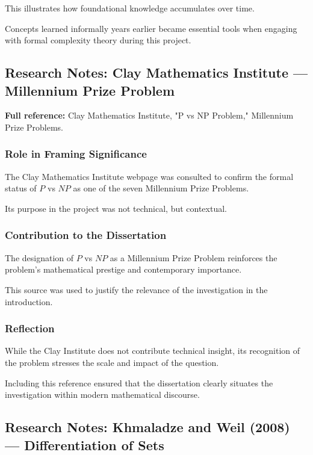 \documentclass[12pt]{article}
\begin{document}
This illustrates how foundational knowledge accumulates over time.

Concepts learned informally years earlier became essential tools when engaging with formal complexity theory during this project.

\subsection{Research Notes: Clay Mathematics Institute --- Millennium Prize Problem}

\textbf{Full reference:} Clay Mathematics Institute,
"P vs NP Problem,"
Millennium Prize Problems.

\subsubsection*{Role in Framing Significance}

The Clay Mathematics Institute webpage was consulted to confirm the formal status of $P$ vs $NP$ as one of the seven Millennium Prize Problems.

Its purpose in the project was not technical, but contextual.

\subsubsection*{Contribution to the Dissertation}

The designation of $P$ vs $NP$ as a Millennium Prize Problem reinforces the problem's mathematical prestige and contemporary importance.

This source was used to justify the relevance of the investigation in the introduction.

\subsubsection*{Reflection}

While the Clay Institute does not contribute technical insight, its recognition of the problem stresses the scale and impact of the question.

Including this reference ensured that the dissertation clearly situates the investigation within modern mathematical discourse.

\subsection{Research Notes: Khmaladze and Weil (2008) --- Differentiation of Sets}
\end{document}
